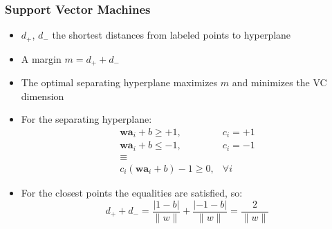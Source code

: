 \documentclass[proffesionalfonts]{beamer}
\begin{document}
\begin{frame}
\frametitle{Support Vector Machines}
  \begin{itemize}
  \item $d_+$, $d_-$ the shortest distances from labeled points to hyperplane
  \item A margin $m = d_+ + d_-$
  \item The optimal separating hyperplane maximizes $m$ and minimizes the VC dimension
  \item For the separating hyperplane:
\setcounter{equation}{0}
    \begin{eqnarray}
      \mathbf w \mathbf a_i + b \geq +1,& c_i = +1\\
      \mathbf w \mathbf a_i + b \leq -1,& c_i = -1\\
      \equiv\\
      c_i(\mathbf w \mathbf a_i + b) - 1 \geq 0,& \forall i
    \end{eqnarray}
  \item For the closest points the equalities are satisfied, so:
    \begin{equation}
      d_+ + d_- = \frac{|1-b|}{\|w\|} + \frac{|-1-b|}{\|w\|} = \frac{2}{\|w\|}
    \end{equation}
  \end{itemize}
\end{frame}
\end{document}
